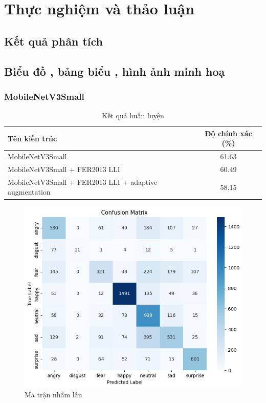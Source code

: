 \section{Thực nghiệm và thảo luận} %

\subsection{Kết quả phân tích}

\subsection{Biểu đồ , bảng biểu , hình ảnh minh hoạ}

\subsubsection{MobileNetV3Small}

\begin{table}[H]
\centering
{}  %
\begin{tabular}{|>{\raggedright\arraybackslash}p{6cm}|c|}
\hline
\rowcolor{gray!40} \textbf{Tên kiến trúc} & \textbf{Độ chính xác (\%)} \\
\hline
MobileNetV3Small & 61.63 \\
MobileNetV3Small + FER2013 LLI & 60.49 \\
MobileNetV3Small + FER2013 LLI + adaptive augmentation & 58.15 \\
\hline
\end{tabular}
\caption{Kết quả huấn luyện}
\end{table}
    
\begin{figure}[H]
\centering
\includegraphics[width=1\textwidth]{img/confusionMatrixMobilenetV3.png}  %
\caption{Ma trận nhầm lẫn}
\end{figure}


